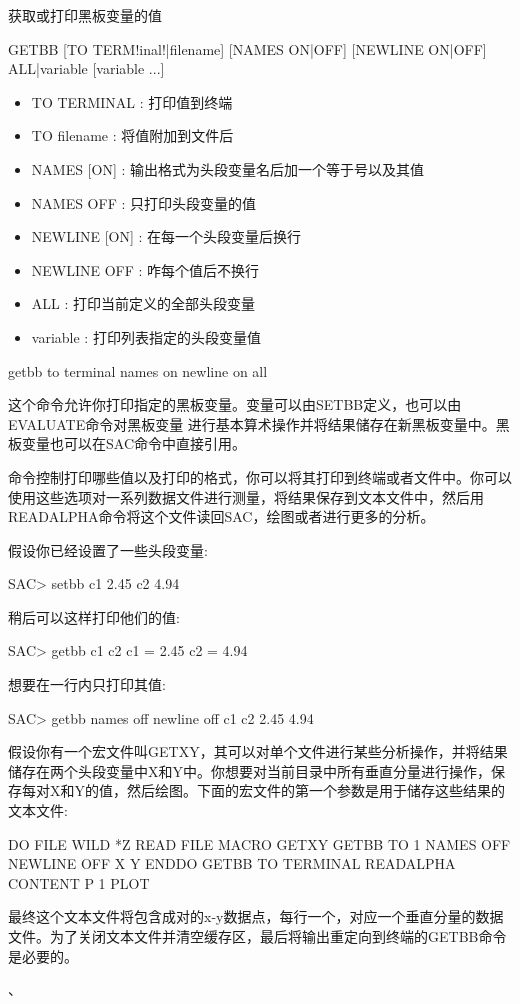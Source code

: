 \label{cmd:getbb}

获取或打印黑板变量的值

\begin{SACSTX}
GETBB [TO TERM!inal!|filename] [NAMES ON|OFF] [NEWLINE ON|OFF] 
    ALL|variable [variable ...]
\end{SACSTX}

\begin{itemize}
\item TO TERMINAL : 打印值到终端
\item TO filename : 将值附加到文件后
\item NAMES [ON] : 输出格式为头段变量名后加一个等于号以及其值
\item NAMES OFF :  只打印头段变量的值 
\item NEWLINE [ON] : 在每一个头段变量后换行 
\item NEWLINE OFF : 咋每个值后不换行 
\item ALL :  打印当前定义的全部头段变量 
\item variable : 打印列表指定的头段变量值 
\end{itemize}

\begin{SACDFT}
getbb to terminal names on newline on all
\end{SACDFT}

这个命令允许你打印指定的黑板变量。变量可以由SETBB定义，也可以由EVALUATE命令对黑板变量
进行基本算术操作并将结果储存在新黑板变量中。黑板变量也可以在SAC命令中直接引用。

命令控制打印哪些值以及打印的格式，你可以将其打印到终端或者文件中。你可以使用这些选项对一系列数据文件进行测量，将结果保存到文本文件中，然后用READALPHA命令将这个文件读回SAC，绘图或者进行更多的分析。

假设你已经设置了一些头段变量:
\begin{SACCode}
SAC> setbb c1 2.45 c2 4.94
\end{SACCode}

稍后可以这样打印他们的值:
\begin{SACCode}
SAC> getbb c1 c2
 c1 = 2.45
 c2 = 4.94
\end{SACCode}

想要在一行内只打印其值:
\begin{SACCode}
SAC> getbb names off newline off c1 c2
 2.45 4.94
\end{SACCode}

假设你有一个宏文件叫GETXY，其可以对单个文件进行某些分析操作，并将结果储存在两个头段变量中X和Y中。你想要对当前目录中所有垂直分量进行操作，保存每对X和Y的值，然后绘图。下面的宏文件的第一个参数是用于储存这些结果的文本文件:
\begin{SACCode}
DO FILE WILD *Z
  READ FILE
  MACRO GETXY
  GETBB TO 1 NAMES OFF NEWLINE OFF X Y
ENDDO
GETBB TO TERMINAL
READALPHA CONTENT P 1
PLOT
\end{SACCode}
最终这个文本文件将包含成对的x-y数据点，每行一个，对应一个垂直分量的数据文件。为了关闭文本文件并清空缓存区，最后将输出重定向到终端的GETBB命令是必要的。

、
